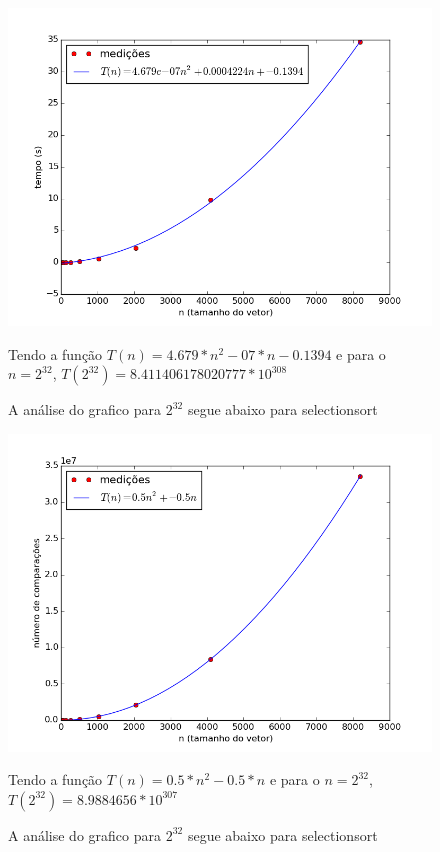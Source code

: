\documentclass[12pt,a4paper,twoside]{report}
\begin{document}
\clearpage


\begin{figure}[ht]
\centering \includegraphics[scale=0.8]{../selectionsort/imagens/selectionsortQuaseDecresc300.png}
\caption{A análise do grafico para $2^{32}$ segue abaixo para selectionsort}

Tendo a função $T(n) = 4.679*n^{2}-07*n-0.1394$ e para o $n =2^{32}$, $T(2^{32}) =8.411406178020777*10^{308}$
\label{fig:selectionsortQuaseDecresc201}
\label{fig:selectionsortQuaseDecresc300}
\end{figure}

\begin{figure}[ht]
\centering \includegraphics[scale=0.8]{../selectionsort/imagens/selectionsortQuaseDecresc301.png}
\caption{A análise do grafico para $2^{32}$ segue abaixo para selectionsort}

Tendo a função $T(n) = 0.5*n^{2}-0.5*n$ e para o $n =2^{32}$, $T(2^{32}) =8.9884656 * 10^{307}$
\label{fig:selectionsortQuaseDecresc301}
\end{figure}
\end{document}
